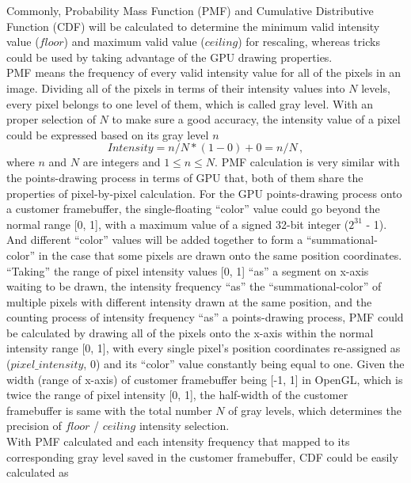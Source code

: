 %
Commonly, Probability Mass Function (PMF) and Cumulative Distributive Function (CDF) will be calculated to determine the minimum valid intensity value (\(floor\)) and maximum valid value (\(ceiling\)) for rescaling, whereas tricks could be used by taking advantage of the GPU drawing properties.%
\\\indent%
PMF means the frequency of every valid intensity value for all of the pixels in an image. Dividing all of the pixels in terms of their intensity values into \(N\) levels, every pixel belongs to one level of them, which is called gray level. With an proper selection of \(N\) to make sure a good accuracy, the intensity value of a pixel could be expressed based on its gray level \(n\)
%
\begin{equation}
Intensity = n/N * (1 - 0) + 0 = n/N \, ,
\end{equation}%
\noindent
where \(n\) and \(N\) are integers and \(1 \leqslant n \leqslant N\).%
%
PMF calculation is very similar with the points-drawing process in terms of GPU that, both of them share the properties of pixel-by-pixel calculation. For the GPU points-drawing process onto a customer framebuffer, the single-floating \enquote{color} value could go beyond the normal range [0, 1], with a maximum value of a signed 32-bit integer (\(2^{31}\) - 1). And different \enquote{color} values will be added together to form a \enquote{summational-color} in the case that some pixels are drawn onto the same position coordinates. \enquote{Taking} the range of pixel intensity values [0, 1] \enquote{as} a segment on x-axis waiting to be drawn, the intensity frequency \enquote{as} the \enquote{summational-color} of multiple pixels with different intensity drawn at the same position, and the counting process of intensity frequency \enquote{as} a points-drawing process, PMF could be calculated by drawing all of the pixels onto the x-axis within the normal intensity range [0, 1], with every single pixel's position coordinates re-assigned as (\(pixel\_intensity\), \(0\)) and its \enquote{color} value constantly being equal to one. Given the width (range of x-axis) of customer framebuffer being [-1, 1] in OpenGL, which is twice the range of pixel intensity [0, 1], the half-width of the customer framebuffer is same with the total number \(N\) of gray levels, which determines the precision of \(floor\) / \(ceiling\) intensity selection. 
\\\indent%
With PMF calculated and each intensity frequency that mapped to its corresponding gray level saved in the customer framebuffer, CDF could be easily calculated as
